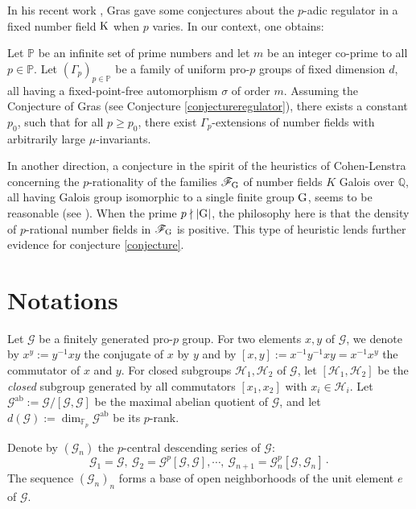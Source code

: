 \documentclass[12pt,a4paper,twoside,english]{smfart}
\def\K{{\rm K}}
\def\Q{{\mathbb Q}}
\def\fq{{\mathbb F}}
\def\PP{{\mathbb P}}
\def\H{{\mathcal H}}
\def\G{{\mathcal G}}
\def\Ff{{\mathcal F}}
\def\ab{{\mathrm{ab}}}
\begin{document}
In his  recent work \cite{gras-heuristics}, Gras gave some conjectures about the $p$-adic regulator in a fixed number field $\K$  when $p$ varies. In our context, one obtains:

\begin{theo} Let $\PP$ be an infinite set of prime numbers and let $m$ be an integer co-prime to all $p \in \PP$.
Let $(\Gamma_p)_{p \in \PP}$ be a family of uniform pro-$p$ groups of fixed dimension $d$, all having a fixed-point-free automorphism $\sigma$ of order $m$.
Assuming the  Conjecture of Gras (see Conjecture \ref{conjectureregulator}), there exists a constant $p_0$, such that for all $p \geq p_0$, there exist $\Gamma_p$-extensions of number fields with arbitrarily large $\mu$-invariants.
\end{theo}

In another direction,  a conjecture in the spirit of the heuristics of Cohen-Lenstra concerning the $p$-rationality of the families $\Ff_{\rm G}$ of number fields $K$ Galois over $\Q$, all having Galois group isomorphic to a single finite group ${\rm G}$, seems to be reasonable (see \cite{Pitoun-Varescon}).
When the prime $p \nmid |{\rm G}|$, the philosophy here is that the  density of $p$-rational number fields in $\Ff_{\rm G}$ is positive.
This type of heuristic lends further evidence for conjecture \ref{conjecture}.

\section*{Notations}

Let $\G$ be a finitely generated pro-$p$ group. For two elements $x,y$ of $\G$, we denote by $x^y:=y^{-1}xy$ the conjugate of $x$ by $y$ and by $[x,y]:=x^{-1}y^{-1}xy=x^{-1}x^y$ the commutator of $x$ and $y$. For 
closed subgroups $\H_1, \H_2$ of $\G$, let $[\H_1, \H_2]$ be the \emph{closed} subgroup generated by all commutators $[x_1, x_2]$ with $x_i \in \H_i$. 
Let  $\G^{\ab}:=\G/[\G,\G]$ be the maximal abelian quotient of $\G$, and let  $d(\G):=\dim_{\fq_p}\G^{\ab}$ be its $p$-rank. 






\medskip

Denote by  $(\G_n)$ the  $p$-central descending series of $\G$: $$\G_1=\G, \ \G_2=\G^p[\G,\G], \cdots, \ \G_{n+1}=\G_n^p[\G,\G_n]\cdot$$ The sequence  $(\G_n)_n$ forms a base of open neighborhoods of the unit element $e$ of $\G$.


\medskip
\end{document}

